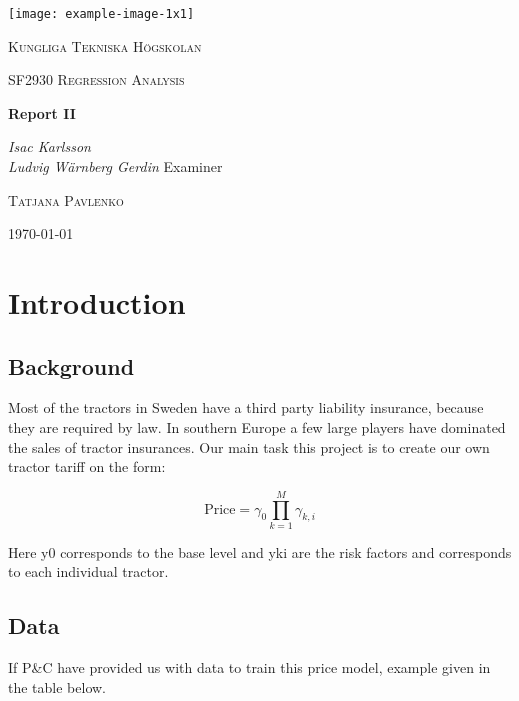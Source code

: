 \documentclass[11pt]{article}
\author{Ludde}
\date{\today}
\title{}
\begin{document}
\begin{titlepage}
\centering
\texttt{[image: example-image-1x1]}\par\vspace{1cm}
{\scshape\LARGE Kungliga Tekniska Högskolan \par}
\vspace{1cm}
{\scshape\Large SF2930 Regression Analysis \par}
\vspace{1.5cm}
{\huge\bfseries Report II \\  \par}
\vspace{2cm}
{\Large\itshape Isac Karlsson \\ Ludvig Wärnberg Gerdin}
\vfill
Examiner \par
\textsc{Tatjana Pavlenko}

\vfill

{\large \today\par}
\end{titlepage}

\newpage
\tableofcontents
\newpage

\section{Introduction}
\label{sec:org5b81261}
\subsection{Background}
\label{sec:org66de239}
Most of the tractors in Sweden have a third party liability insurance, because they are required by law. 
In southern Europe a few large players have dominated the sales of tractor insurances. Our main task this
project is to create our own tractor tariff on the form:

\begin{equation}
  \text{Price} = \gamma_0 \prod_{k = 1}^M \gamma_{k,i}  
\end{equation}

Here y0 corresponds to the base level and yki are the risk factors and corresponds to each individual 
tractor. 

\subsection{Data}
\label{sec:org821dc54}

If P\&C have provided us with data to train this price model, example given in the table below.
\end{document}
